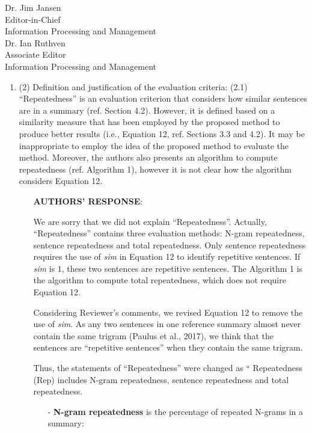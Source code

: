 \documentclass[11pt]{letter} %
\begin{document}
\begin{letter}{Dr. Jim Jansen \\
			Editor-in-Chief  \\
			Information Processing and Management\\
			Dr. Ian Ruthven \\
			Associate Editor \\
			Information Processing and Management}
\begin{enumerate}
\begin{itemize}
\begin{itemize}
				on top of vanilla CNN models.
			   \end{itemize}
			\end{itemize}
			\item (2) Definition and justification of the evaluation criteria:
            (2.1) ``Repeatedness'' is an evaluation criterion that considers how similar sentences are in a summary (ref. Section 4.2). However, it is defined based on a similarity measure that has been employed by the proposed method to produce better results (i.e., Equation 12, ref. Sections 3.3 and 4.2). It may be inappropriate to employ the idea of the proposed method to evaluate the method. Moreover, the authors also presents an algorithm to compute repeatedness (ref. Algorithm 1), however it is not clear how the algorithm considers Equation 12.
			\begin{itemize}
				\item[] \textbf{AUTHORS' RESPONSE}: 
				
			    We are sorry that we did not explain ``Repeatedness''.
				Actually, ``Repeatedness'' contains three evaluation methods: 
				N-gram repeatedness, sentence repeatedness and total repeatedness. 
				Only sentence repeatedness requires the use of \textit{sim} 
				in Equation 12 to identify repetitive sentences. 
				If \textit{sim} is $1$, these two sentences are repetitive sentences.
				The Algorithm 1 is the algorithm to compute total repeatedness,
				which does not require Equation 12.
               
			    \hspace*{0.6cm}
				Considering Reviewer's comments, 
				we revised Equation 12 to remove the use of \textit{sim}.
				As any two sentences in one reference summary 
				almost never contain the same trigram (Paulus et al., 2017),
				we think that the sentences are ``repetitive sentences'' 
				when they contain the same trigram. 

			    \hspace*{0.6cm}
                Thus, the statements of ``Repeatedness''
				were changed as ``
				Repeatedness (Rep) includes N-gram repeatedness, sentence repeatedness
				and total repeatedness.
				\begin{itemize}
				\item[-] \textbf{N-gram repeatedness} is the percentage of repeated N-grams 
				in a summary:


\end{itemize}
\end{itemize}
\end{enumerate}
\end{letter}
\end{document}
